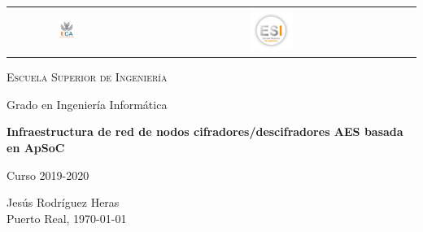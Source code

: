 \documentclass{book}
\newenvironment{changemargin}[2]{%
	\begin{list}{}{%
			\setlength{\topsep}{0pt}%
			\setlength{\leftmargin}{#1}%
			\setlength{\rightmargin}{#2}%
			\setlength{\listparindent}{\parindent}%
			\setlength{\itemindent}{\parindent}%
			\setlength{\parsep}{\parskip}%
		}%
		\item[]}{\end{list}}
\begin{document}
\begin{titlepage}
	\centering

\begin{table}[htb]
				\centering
				\begin{tabular}{cc}
					\includegraphics[width=0.15\textwidth]{UCA.png}\par\vspace{0.2cm} & \includegraphics[width=0.15\textwidth]{ESI.png}\par\vspace{0.2cm}
				\end{tabular}
			\end{table}
	
	
	\begin{changemargin}{3em}{3em}
		\centering
		
		{\LARGE \textsc{\nohyphens{Escuela Superior de Ingeniería}}}
		
		\bigskip
		\bigskip
		\bigskip
		\bigskip
		
		{\LARGE \nohyphens{Grado en Ingeniería Informática}}
		
		\bigskip
		\bigskip
		\bigskip
		\bigskip
		\bigskip
		
		{\LARGE \nohyphens{\textbf{Infraestructura de red de nodos cifradores/descifradores AES basada en ApSoC}}}
		
		\bigskip
		\bigskip
		\bigskip
		\bigskip
		
		{\large Curso 2019-2020}
		
		\bigskip
		\bigskip
		\bigskip
		\bigskip
		
	\end{changemargin}
	
	{\Large Jesús Rodríguez Heras} \\
	\bigskip
	\bigskip 
	\bigskip 
	{\large Puerto Real, \today}
	
\end{titlepage}
\end{document}
